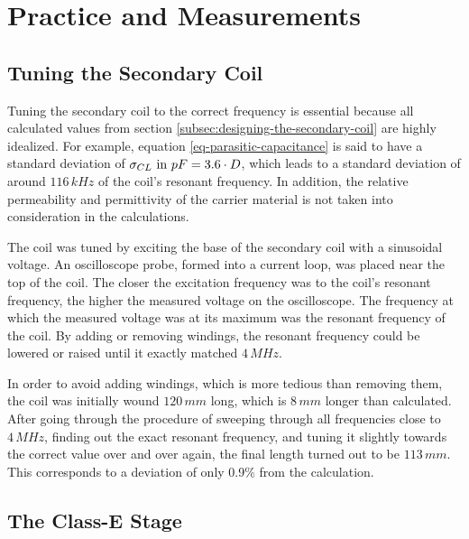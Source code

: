 \setchapterpreamble[u]{\margintoc}

\chapter{Practice and Measurements} %

\section{Tuning the Secondary Coil}\label{TC-tuningTheSecondary}

Tuning the secondary coil to the correct frequency is essential because all calculated values from section \ref{subsec:designing-the-secondary-coil} are highly idealized. For example, equation \ref{eq-parasitic-capacitance} is said to have a standard deviation of \(\sigma_{CL} \text{ in } \\pF = 3.6 \cdot D\), which leads to a standard deviation of around \(116\,kHz\) of the coil's resonant frequency. In addition, the relative permeability and permittivity of the carrier material is not taken into consideration in the calculations.

The coil was tuned by exciting the base of the secondary coil with a sinusoidal voltage. An oscilloscope probe, formed into a current loop, was placed near the top of the coil. The closer the excitation frequency was to the coil's resonant frequency, the higher the measured voltage on the oscilloscope. The frequency at which the measured voltage was at its maximum was the resonant frequency of the coil. By adding or removing windings, the resonant frequency could be lowered or raised until it exactly matched \(4\,MHz\).

In order to avoid adding windings, which is more tedious than removing them, the coil was initially wound \(120\,mm\) long, which is \(8\,mm\) longer than calculated. After going through the procedure of sweeping through all frequencies close to \(4\,MHz\), finding out the exact resonant frequency, and tuning it slightly towards the correct value over and over again, the final length turned out to be \(113\,mm\). This corresponds to a deviation of only 0.9\% from the calculation.

\section{The Class-E Stage}

